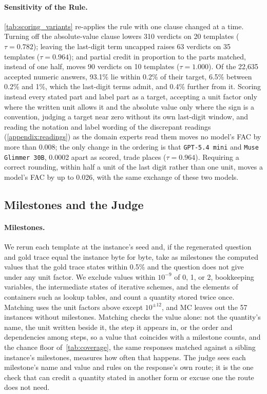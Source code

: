 \paragraph{Sensitivity of the Rule.} \autoref{tab:scoring_variants} re-applies the rule with one
clause changed at a time.
Turning off the absolute-value clause lowers 310 verdicts on 20 templates ($\tau = 0.782$); leaving
the last-digit term uncapped raises 63 verdicts on 35 templates ($\tau = 0.964$); and partial credit
in proportion to the parts matched, instead of one half, moves 90 verdicts on 10 templates
($\tau = 1.000$).
Of the 22,635 accepted numeric answers, 93.1\% lie within 0.2\% of their target, 6.5\% between
0.2\% and 1\%, which the last-digit terms admit, and 0.4\% further from it.
Scoring instead every stated part and label part as a target, accepting a unit factor only where the
written unit allows it and the absolute value only where the sign is a convention, judging a target
near zero without its own last-digit window, and reading the notation and label wording of the
discrepant readings (\autoref{appendix:readings}) as the domain experts read them moves no model's
FAC by more than 0.008; the only change in the ordering is that \texttt{GPT-5.4 mini} and
\texttt{Muse Glimmer 30B}, 0.0002 apart as scored, trade places ($\tau = 0.964$).
Requiring a correct rounding, within half a unit of the last digit rather than one unit, moves a
model's FAC by up to 0.026, with the same exchange of these two models.

\subsection{Milestones and the Judge}

\paragraph{Milestones.} We rerun each template at the instance's seed and, if the regenerated
question and gold trace equal the instance byte for byte, take as milestones the computed values
that the gold trace states within 0.5\% and the question does not give under any unit factor.
We exclude values within $10^{-9}$ of 0, 1, or 2, bookkeeping variables, the intermediate states of
iterative schemes, and the elements of containers such as lookup tables, and count a quantity
stored twice once.
Matching uses the unit factors above except $10^{\pm 12}$, and MC leaves out the 57 instances
without milestones.
Matching checks the value alone: not the quantity's name, the unit written beside it, the step it
appears in, or the order and dependencies among steps, so a value that coincides with a milestone
counts, and the chance floor of~\autoref{tab:coverage}, the same responses matched against a
sibling instance's milestones, measures how often that happens.
The judge sees each milestone's name and value and rules on the response's own route; it is the
one check that can credit a quantity stated in another form or excuse one the route does not need.

